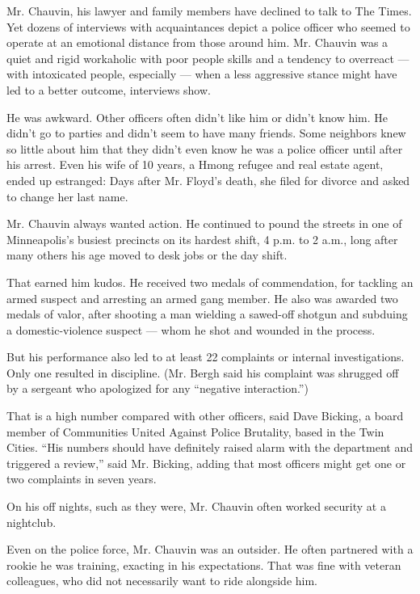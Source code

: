 Mr. Chauvin, his lawyer and family members have declined to talk to The
Times. Yet dozens of interviews with acquaintances depict a police
officer who seemed to operate at an emotional distance from those around
him. Mr. Chauvin was a quiet and rigid workaholic with poor people
skills and a tendency to overreact --- with intoxicated people,
especially --- when a less aggressive stance might have led to a better
outcome, interviews show.

He was awkward. Other officers often didn't like him or didn't know him.
He didn't go to parties and didn't seem to have many friends. Some
neighbors knew so little about him that they didn't even know he was a
police officer until after his arrest. Even his wife of 10 years, a
Hmong refugee and real estate agent, ended up estranged: Days after Mr.
Floyd's death, she filed for divorce and asked to change her last name.

Mr. Chauvin always wanted action. He continued to pound the streets in
one of Minneapolis's busiest precincts on its hardest shift, 4 p.m. to 2
a.m., long after many others his age moved to desk jobs or the day
shift.

That earned him kudos. He received two medals of commendation, for
tackling an armed suspect and arresting an armed gang member. He also
was awarded two medals of valor, after shooting a man wielding a
sawed-off shotgun and subduing a domestic-violence suspect --- whom he
shot and wounded in the process.

But his performance also led to at least 22 complaints or internal
investigations. Only one resulted in discipline. (Mr. Bergh said his
complaint was shrugged off by a sergeant who apologized for any
``negative interaction.'')

That is a high number compared with other officers, said Dave Bicking, a
board member of Communities United Against Police Brutality, based in
the Twin Cities. ``His numbers should have definitely raised alarm with
the department and triggered a review,'' said Mr. Bicking, adding that
most officers might get one or two complaints in seven years.

On his off nights, such as they were, Mr. Chauvin often worked security
at a nightclub.

Even on the police force, Mr. Chauvin was an outsider. He often
partnered with a rookie he was training, exacting in his expectations.
That was fine with veteran colleagues, who did not necessarily want to
ride alongside him.


